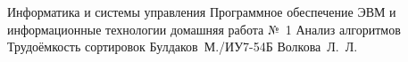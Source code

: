 \documentclass{bmstu}[a4paper]
\begin{document}
\makereporttitle
{Информатика и системы управления} %
{Программное обеспечение ЭВМ и информационные технологии} %
{домашняя работа №~1} %
{Анализ алгоритмов} %
{Трудоёмкость сортировок} %
{} %
{Булдаков~М./ИУ7-54Б} %
{Волкова~Л.~Л.} %

\maketableofcontents




\makebibliography

%
\end{document}
